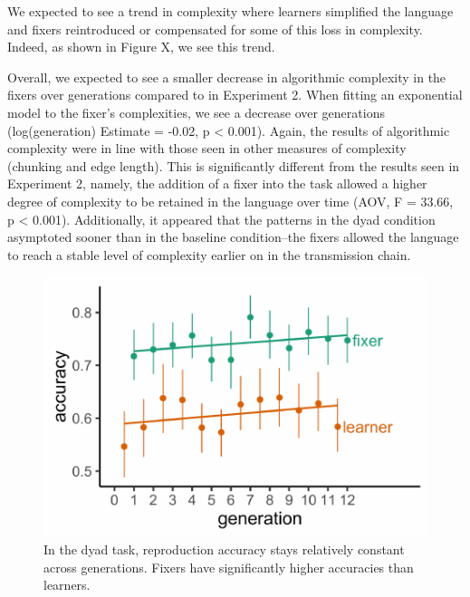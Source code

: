 \documentclass[10pt, letterpaper]{article}
\newenvironment{CodeChunk}{}{}
\begin{document}
We expected to see a trend in complexity where learners simplified the
language and fixers reintroduced or compensated for some of this loss in
complexity. Indeed, as shown in Figure X, we see this trend.

Overall, we expected to see a smaller decrease in algorithmic complexity
in the fixers over generations compared to in Experiment 2. When fitting
an exponential model to the fixer's complexities, we see a decrease over
generations (log(generation) Estimate = -0.02, p \textless{} 0.001).
Again, the results of algorithmic complexity were in line with those
seen in other measures of complexity (chunking and edge length). This is
significantly different from the results seen in Experiment 2, namely,
the addition of a fixer into the task allowed a higher degree of
complexity to be retained in the language over time (AOV, F = 33.66, p
\textless{} 0.001). Additionally, it appeared that the patterns in the
dyad condition asymptoted sooner than in the baseline condition--the
fixers allowed the language to reach a stable level of complexity
earlier on in the transmission chain.

\begin{CodeChunk}
\begin{figure}[tb]

{\centering \includegraphics{figs/dyad_accuracy-1} 

}

\caption[In the dyad task, reproduction accuracy stays relatively constant across generations]{In the dyad task, reproduction accuracy stays relatively constant across generations. Fixers have significantly higher accuracies than learners.}\label{fig:dyad_accuracy}
\end{figure}
\end{CodeChunk}
\end{document}
